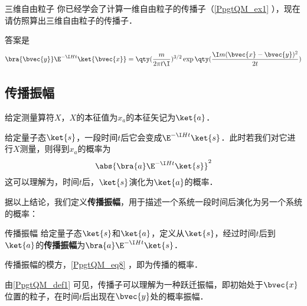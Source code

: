 \begin{exercise}{三维自由粒子}
你已经学会了计算一维自由粒子的传播子（\autoref{PpgtQM_ex1} ），现在请仿照算出三维自由粒子的传播子．

答案是
\begin{equation}
\bra{\bvec{y}}\E^{-\I H t}\ket{\bvec{x}} = \qty(\frac{m}{2\pi t\I})^{3/2}\exp\qty(\frac{\I m(\bvec{x}-\bvec{y})^2}{2t})
\end{equation}
\end{exercise}









\subsection{传播振幅}


给定测量算符$X$，$X$的本征值为$x_a$的本征矢记为$\ket{a}$．

给定量子态$\ket{s}$，一段时间$t$后它会变成$\E^{-\I Ht}\ket{s}$．此时若我们对它进行$X$测量，则得到$x_a$的概率为
\begin{equation}\label{PpgtQM_eq8}
\abs{\bra{a}\E^{-\I Ht}\ket{s}}^2
\end{equation}
这可以理解为，时间$t$后，$\ket{s}$演化为$\ket{a}$的概率．

据以上结论，我们定义\textbf{传播振幅}，用于描述一个系统一段时间后演化为另一个系统的概率：

\begin{definition}{传播振幅}\label{PpgtQM_def1}
给定量子态$\ket{s}$和$\ket{a}$，定义从$\ket{s}$，经过时间$t$后到$\ket{a}$的\textbf{传播振幅}为$\bra{a}\E^{-\I Ht}\ket{s}$．

传播振幅的模方，\autoref{PpgtQM_eq8} ，即为传播的概率．
\end{definition}

由\autoref{PpgtQM_def1} 可见，传播子可以理解为一种跃迁振幅，即初始处于$\bvec{x}$位置的粒子，在时间$t$后出现在$\bvec{y}$处的概率振幅．



















